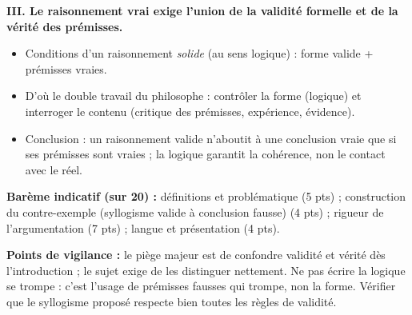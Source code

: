 \documentclass[11pt]{article}
\begin{document}
\begin{corrige}
\textbf{III. Le raisonnement vrai exige l'union de la validité formelle et de la vérité des prémisses.}
\begin{itemize}
\item Conditions d'un raisonnement \emph{solide} (au sens logique) : forme valide + prémisses vraies.
\item D'où le double travail du philosophe : contrôler la forme (logique) et interroger le contenu (critique des prémisses, expérience, évidence).
\item Conclusion : un raisonnement valide n'aboutit à une conclusion vraie que si ses prémisses sont vraies ; la logique garantit la cohérence, non le contact avec le réel.
\end{itemize}

\textbf{Barème indicatif (sur 20) :} définitions et problématique (5 pts) ; construction du contre-exemple (syllogisme valide à conclusion fausse) (4 pts) ; rigueur de l'argumentation (7 pts) ; langue et présentation (4 pts).

\textbf{Points de vigilance :} le piège majeur est de confondre validité et vérité dès l'introduction ; le sujet exige de les distinguer nettement. Ne pas écrire \guillemotleft la logique se trompe \guillemotright : c'est l'usage de prémisses fausses qui trompe, non la forme. Vérifier que le syllogisme proposé respecte bien toutes les règles de validité.
\end{corrige}
\end{document}

